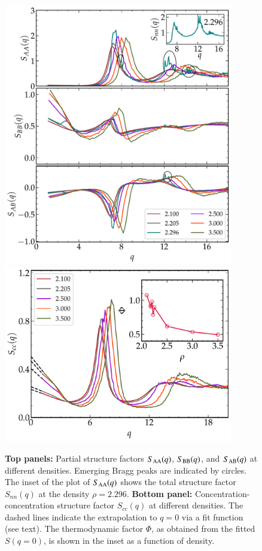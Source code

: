 \begin{figure}
\centering
\includegraphics[width=10cm]{figs/fig6p3top.pdf}
\includegraphics[width=10cm]{figs/fig6p3bottom.pdf}
\caption[{\em Partial structure factors and concentration-concentration structure factors $S_{cc}(q)$ at different densities. The thermodynamic factor $\Phi$, as obtained from the fit to $S_{cc}(q)$}]{{\bf Top panels:} Partial structure factors $S_{\rm AA}(q)$, $S_{\rm BB}(q)$, and $S_{\rm AB}(q)$ at different densities.  Emerging Bragg peaks are indicated by circles. The inset of the plot of $S_{\rm AA}(q)$ shows the total structure factor $S_{nn}(q)$ at the density $\rho = 2.296$. {\bf Bottom panel:} Concentration-concentration structure factor $S_{cc}(q)$ at different densities. The dashed lines indicate the extrapolation to $q=0$ via a fit function (see text). The thermodynamic factor $\Phi$, as obtained from the fitted $S(q=0)$, is shown in the inset as a function of density. \label{fig6p3}}
\end{figure}
